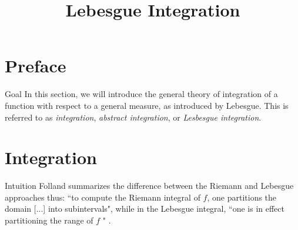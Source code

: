 \documentclass[10pt]{beamer}
\title{Lebesgue Integration}
\begin{document}
\maketitle

\section{Preface}

\begin{frame}{Goal}
In this section, we will introduce the general theory of integration of a function with respect to a general measure, as introduced by Lebesgue.  This is referred to as \textit{integration}, \textit{abstract integration}, or \textit{Lesbesgue integration}.

\end{frame}

\section{Integration}

\begin{frame}{Intuition}
Folland summarizes the difference between the Riemann and Lebesgue approaches thus: ``to compute the Riemann integral of $f$, one partitions the domain [...] into subintervals", while in the Lebesgue integral, ``one is in effect partitioning the range of $f$ " \cite{folland1999real}.

\end{frame} 
	
\end{document}
